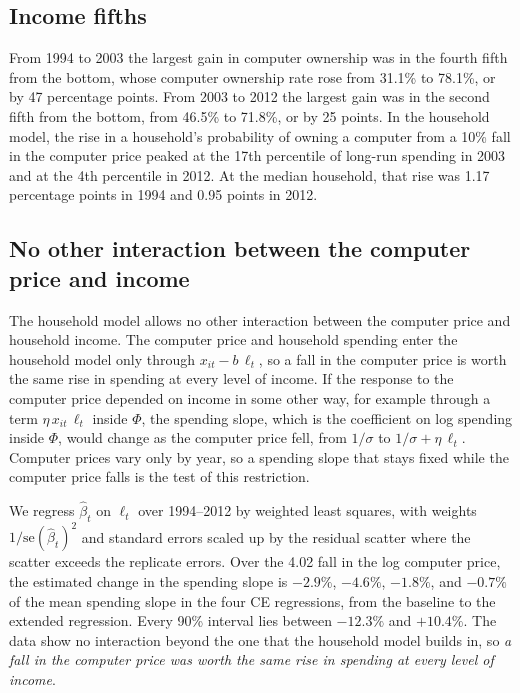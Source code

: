 \documentclass[11pt]{article}
\begin{document}
\subsection{Income fifths}
\label{app:fifths}

From 1994 to 2003 the largest gain in computer ownership was in the fourth fifth from the bottom, whose computer ownership rate rose from 31.1\% to 78.1\%, or by 47 percentage points. From 2003 to 2012 the largest gain was in the second fifth from the bottom, from 46.5\% to 71.8\%, or by 25 points. In the household model, the rise in a household's probability of owning a computer from a 10\% fall in the computer price peaked at the 17th percentile of long-run spending in 2003 and at the 4th percentile in 2012. At the median household, that rise was 1.17 percentage points in 1994 and 0.95 points in 2012.

\subsection{No other interaction between the computer price and income}
\label{app:nointeraction}

The household model allows no other interaction between the computer price and household income. The computer price and household spending enter the household model only through $x_{it} - b\,\ell_t$, so a fall in the computer price is worth the same rise in spending at every level of income. If the response to the computer price depended on income in some other way, for example through a term $\eta\,x_{it}\,\ell_t$ inside $\Phi$, the spending slope, which is the coefficient on log spending inside $\Phi$, would change as the computer price fell, from $1/\sigma$ to $1/\sigma + \eta\,\ell_t$. Computer prices vary only by year, so a spending slope that stays fixed while the computer price falls is the test of this restriction.

We regress $\hat\beta_t$ on $\ell_t$ over 1994--2012 by weighted least squares, with weights $1/\text{se}(\hat\beta_t)^2$ and standard errors scaled up by the residual scatter where the scatter exceeds the replicate errors. Over the 4.02 fall in the log computer price, the estimated change in the spending slope is $-2.9\%$, $-4.6\%$, $-1.8\%$, and $-0.7\%$ of the mean spending slope in the four CE regressions, from the baseline to the extended regression. Every 90\% interval lies between $-12.3\%$ and $+10.4\%$. The data show no interaction beyond the one that the household model builds in, so \emph{a fall in the computer price was worth the same rise in spending at every level of income}.
\end{document}

